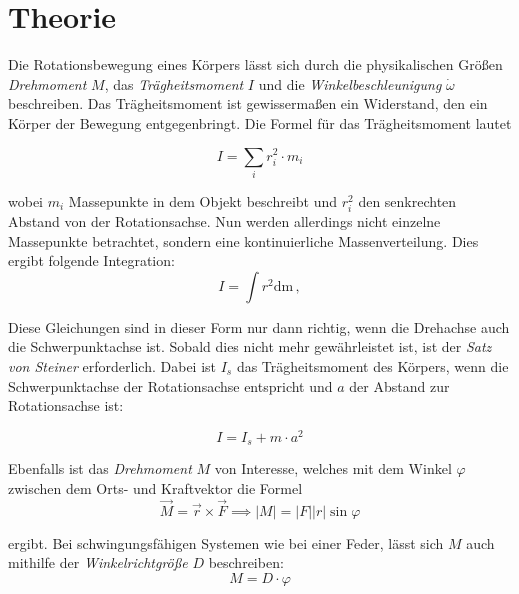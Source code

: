 \section{Theorie \tiny{\cite{v101}}}
\label{sec:Theorie}
\setlength{\parindent}{0pt}

Die Rotationsbewegung eines Körpers lässt sich durch die physikalischen Größen \textit{Drehmoment} $M$, das 
\textit{Trägheitsmoment} $I$ und die \textit{Winkelbeschleunigung} $\dot{\omega}$ beschreiben.
Das Trägheitsmoment ist gewissermaßen ein Widerstand, den ein Körper der Bewegung entgegenbringt.
Die Formel für das Trägheitsmoment lautet



\begin{equation*}
    I = \sum_{i} r_{i}^2 \cdot m_{i} 
\end{equation*}

wobei $m_{i}$ Massepunkte in dem Objekt beschreibt und $r_{i}^2$ den senkrechten Abstand von der Rotationsachse.
Nun werden allerdings nicht einzelne Massepunkte betrachtet, sondern eine kontinuierliche Massenverteilung.
Dies ergibt folgende Integration:
\begin{equation}
    I = \int r^2 \text{dm} \,,
\end{equation}

Diese Gleichungen sind in dieser Form nur dann richtig, wenn die Drehachse auch die Schwerpunktachse ist.
Sobald dies nicht mehr gewährleistet ist, ist der \textit{Satz von Steiner} erforderlich.
Dabei ist $I_{s}$ das Trägheitsmoment des Körpers, wenn die Schwerpunktachse der Rotationsachse entspricht
und $a$ der Abstand zur Rotationsachse ist:

\begin{equation} \label{eq:SatzvSteiner}
    I = I_{s} + m \cdot a^2
\end{equation}

Ebenfalls ist das \textit{Drehmoment} $M$ von Interesse, welches mit dem Winkel $\varphi$ zwischen dem Orts- und Kraftvektor die Formel
\begin{equation} \label{eq:drehmoment}
    \vec{M} = \vec{r} \times \vec{F} \implies \lvert M \rvert = \lvert F \rvert \lvert r \rvert \sin{\varphi}
\end{equation}

ergibt. Bei schwingungsfähigen Systemen wie bei einer Feder, lässt sich $M$ auch mithilfe der \textit{Winkelrichtgröße} $D$ beschreiben:
\begin{equation} \label{eq:drehmomentwinkel}
    M = D \cdot \varphi
\end{equation}

